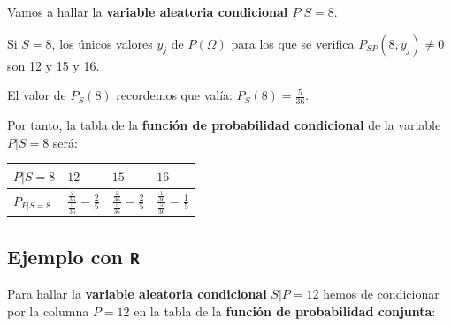 \documentclass[]{book}
\begin{document}
Vamos a hallar la \textbf{variable aleatoria condicional \(P|S=8\)}.

Si \(S=8\), los únicos valores \(y_j\) de \(P(\Omega)\) para los que se verifica \(P_{SP}(8,y_j)\neq 0\) son 12 y 15 y 16.

El valor de \(P_S(8)\) recordemos que valía: \(P_S(8)=\frac{5}{36}\).

Por tanto, la tabla de la \textbf{función de probabilidad condicional} de la variable \(P|S=8\) será:

\begin{longtable}[]{@{}llll@{}}
\toprule
\begin{minipage}[b]{0.22\columnwidth}\raggedright
\(P|S=8\)\strut
\end{minipage} & \begin{minipage}[b]{0.22\columnwidth}\raggedright
\(12\)\strut
\end{minipage} & \begin{minipage}[b]{0.22\columnwidth}\raggedright
\(15\)\strut
\end{minipage} & \begin{minipage}[b]{0.22\columnwidth}\raggedright
\(16\)\strut
\end{minipage}\tabularnewline
\midrule
\endhead
\begin{minipage}[t]{0.22\columnwidth}\raggedright
\(P_{P|S=8}\)\strut
\end{minipage} & \begin{minipage}[t]{0.22\columnwidth}\raggedright
\(\frac{\frac{2}{36}}{\frac{5}{36}}=\frac{2}{5}\)\strut
\end{minipage} & \begin{minipage}[t]{0.22\columnwidth}\raggedright
\(\frac{\frac{2}{36}}{\frac{5}{36}}=\frac{2}{5}\)\strut
\end{minipage} & \begin{minipage}[t]{0.22\columnwidth}\raggedright
\(\frac{\frac{1}{36}}{\frac{5}{36}}=\frac{1}{5}\)\strut
\end{minipage}\tabularnewline
\bottomrule
\end{longtable}

\hypertarget{ejemplo-con-r-6}{%
\subsection{\texorpdfstring{Ejemplo con \texttt{R}}{Ejemplo con R}}\label{ejemplo-con-r-6}}

Para hallar la \textbf{variable aleatoria condicional} \(S|P=12\) hemos de condicionar por la columna \(P=12\) en la tabla de la \textbf{función de probabilidad conjunta}:
\end{document}

